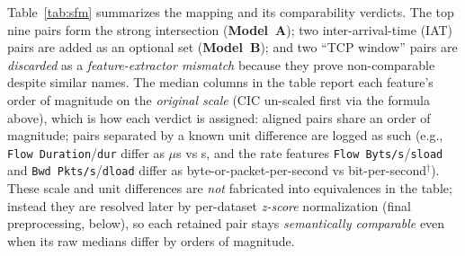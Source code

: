 \documentclass[preprint,12pt,authoryear]{elsarticle}
\begin{document}
Table~\ref{tab:sfm} summarizes the mapping and its comparability verdicts. The top
nine pairs form the strong intersection (\textbf{Model~A}); two inter-arrival-time
(IAT) pairs are added as an optional set (\textbf{Model~B}); and two ``TCP window''
pairs are \emph{discarded} as a \emph{feature-extractor mismatch} because they prove
non-comparable despite similar names. The median columns in the table report each
feature's order of magnitude on the \emph{original scale} (CIC un-scaled first via
the formula above), which is how each verdict is assigned: aligned pairs share an
order of magnitude; pairs separated by a known unit difference are logged as such
(e.g., \texttt{Flow Duration}/\texttt{dur} differ as $\mu$s vs s, and the rate
features \texttt{Flow Byts/s}/\texttt{sload} and \texttt{Bwd Pkts/s}/\texttt{dload}
differ as byte-or-packet-per-second vs bit-per-second$^\dagger$). These scale and
unit differences are \emph{not} fabricated into equivalences in the table; instead
they are resolved later by per-dataset \emph{z-score} normalization (final
preprocessing, below), so each retained pair stays \emph{semantically comparable}
even when its raw medians differ by orders of magnitude.
\end{document}
